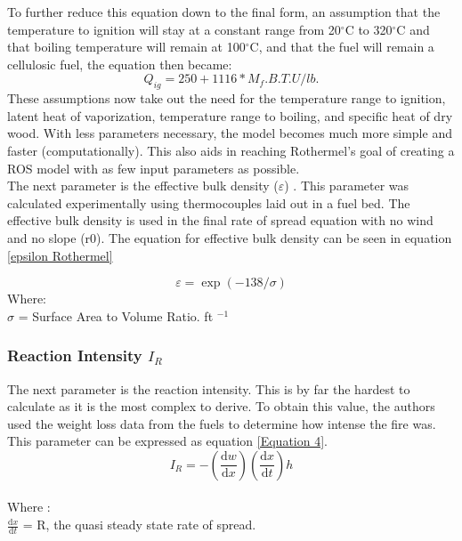 \documentclass{article}
\begin{document}
To further reduce this equation down to the final form, an assumption that the temperature to ignition will stay at a constant range from 20$^{\circ}$C to 320$^{\circ}$C and that boiling temperature will remain at 100$^{\circ}$C, and that the fuel will remain a cellulosic fuel, the equation then became: 
\begin{equation}
\label{Equation 3}
	Q_{ig} = 250 + 1116 * M_f. B.T.U/lb. 
\end{equation}
\indent These assumptions now take out the need for the temperature range to ignition, latent heat of vaporization, temperature range to boiling, and specific heat of dry wood. With less parameters necessary, the model becomes much more simple and faster (computationally). This also aids in reaching Rothermel's goal of creating a ROS model with as few input parameters as possible. \\
\indent The next parameter is the effective bulk density ($\varepsilon$) . This parameter was calculated experimentally using thermocouples laid out in a fuel bed. The effective bulk density is used in the final rate of spread equation with no wind and no slope (r0). The equation for effective bulk density can be seen in equation \ref{epsilon Rothermel}

\begin{equation}
	\varepsilon = \exp(-138 / \sigma)
	\label{epsilon Rothermel}
\end{equation}
Where: \\
$\sigma$ = Surface Area to Volume Ratio. ft $^{-1}$
\subsubsection{Reaction Intensity $I_R$}
\indent The next parameter is the reaction intensity. This is by far the hardest to calculate as it is the most complex to derive. To obtain this value, the authors used the weight loss data from the fuels to determine how intense the fire was. This parameter can be expressed as equation \ref{Equation 4}.
\begin{equation}
	\label{Equation 4}
	I_R = - (\frac {\mathrm {d}w} {\mathrm{d} x}) (\frac {\mathrm {d}x} {\mathrm{d} t}) h 
\end{equation}\\
Where :\\
$\frac {\mathrm {d}x} {\mathrm{d} t}$ = R, the quasi steady state rate of spread. \\
\end{document}
